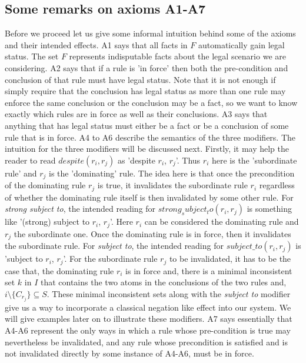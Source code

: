 \subsection{Some remarks on axioms A1-A7}
Before we proceed let us give some informal intuition behind some of the axioms and their intended effects. A1 says that all facts in $F$ automatically gain legal status. The set $F$ represents indisputable facts about the legal scenario we are considering. A2 says that if a rule is 'in force' then both the pre-condition and conclusion of that rule must have legal status. Note that it is not enough if simply require that the conclusion has legal status as more than one rule may enforce the same conclusion or the conclusion may be a fact, so we want to know exactly which rules are in force as well as their conclusions. A3 says that anything that has legal status must either be a fact or be a conclusion of some rule that is in force. A4 to A6 describe the semantics of the three modifiers. The intuition for the three modifiers will be discussed next. Firstly, it may help the reader to read $despite(r_{i},r_{j})$ as 'despite $r_{i}$, $r_{j}$'. Thus $r_{i}$ here is the 'subordinate rule' and $r_{j}$ is the 'dominating' rule. The idea here is that once the precondition of the dominating rule $r_{j}$  is true, it invalidates the subordinate rule $r_{i}$  regardless of whether the dominating rule itself is then invalidated by some other rule. For \textit{strong subject to}, the intended reading for $strong_subject_to(r_{i},r_{j})$ is something like '(strong) subject to $r_{i}$, $r_{j}$'. Here $r_{i}$ can be considered the dominating rule and $r_{j}$ the subordinate one. Once the dominating rule  is in force, then it invalidates the subordinate rule. For \textit{subject to}, the intended reading for $subject\_to(r_{i},r_{j})$ is 'subject to $r_{i}$, $r_{j}$'. For the subordinate rule $r_{j}$ to be invalidated, it has to be the case that, the dominating rule $r_{i}$ is in force and, there is a minimal inconsistent set $k$ in $I$ that contains the two atoms in the conclusions of the two rules and, $i\setminus\{C_{r_{j}}\}\subseteq S$. These minimal inconsistent sets along with the \textit{subject to} modifier give us a way to incorporate a classical negation like effect into our system. We will give examples later on to illustrate these modifiers. A7 says essentially that A4-A6 represent the only ways in which a rule whose pre-condition is true may nevertheless be invalidated, and any rule whose precondition is satisfied and is not invalidated directly by some instance of A4-A6, must be in force. 


